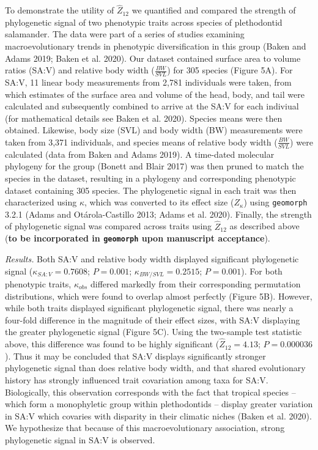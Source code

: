 \documentclass[]{article}
\begin{document}
To demonstrate the utility of \(\hat{Z}_{12}\) we quantified and
compared the strength of phylogenetic signal of two phenotypic traits
across species of plethodontid salamander. The data were part of a
series of studies examining macroevolutionary trends in phenotypic
diversification in this group (Baken and Adams 2019; Baken et al. 2020).
Our dataset contained surface area to volume ratios (SA:V) and relative
body width (\(\frac{BW}{SVL}\)) for 305 species (Figure 5A). For SA:V,
11 linear body measurements from 2,781 individuals were taken, from
which estimates of the surface area and volume of the head, body, and
tail were calculated and subsequently combined to arrive at the SA:V for
each indiviual (for mathematical details see Baken et al. 2020). Species
means were then obtained. Likewise, body size (SVL) and body width (BW)
measurements were taken from 3,371 individuals, and species means of
relative body width (\(\frac{BW}{SVL}\)) were calculated (data from
Baken and Adams 2019). A time-dated molecular phylogeny for the group
(Bonett and Blair 2017) was then pruned to match the species in the
dataset, resulting in a phylogeny and corresponding phenotypic dataset
containing 305 species. The phylogenetic signal in each trait was then
characterized using \(\kappa\), which was converted to its effect size
(\(Z_\kappa\)) using \texttt{geomorph} 3.2.1 (Adams and Otárola-Castillo
2013; Adams et al. 2020). Finally, the strength of phylogenetic signal
was compared across traits using \(\hat{Z}_{12}\) as described above
(\textbf{to be incorporated in \texttt{geomorph} upon manuscript
acceptance}). \hfill\break

\emph{Results.} Both SA:V and relative body width displayed significant
phylogenetic signal (\(\kappa_{SA:V}=0.7608\); \(P=0.001\);
\(\kappa_{BW/SVL}=0.2515\); \(P=0.001\)). For both phenotypic traits,
\(\kappa_{obs}\) differed markedly from their corresponding permutation
distributions, which were found to overlap almost perfectly (Figure 5B).
However, while both traits displayed significant phylogenetic signal,
there was nearly a four-fold difference in the magnitude of their effect
sizes, with SA:V displaying the greater phylogenetic signal (Figure 5C).
Using the two-sample test statistic above, this difference was found to
be highly significant (\(\hat{Z}_{12}=4.13\); \(P=0.000036\)). Thus it
may be concluded that SA:V displays significantly stronger phylogenetic
signal than does relative body width, and that shared evolutionary
history has strongly influenced trait covariation among taxa for SA:V.
Biologically, this observation corresponds with the fact that tropical
species -- which form a monophyletic group within plethodontids --
display greater variation in SA:V which covaries with disparity in their
climatic niches (Baken et al. 2020). We hypothesize that because of this
macroevolutionary association, strong phylogenetic signal in SA:V is
observed.
\end{document}
